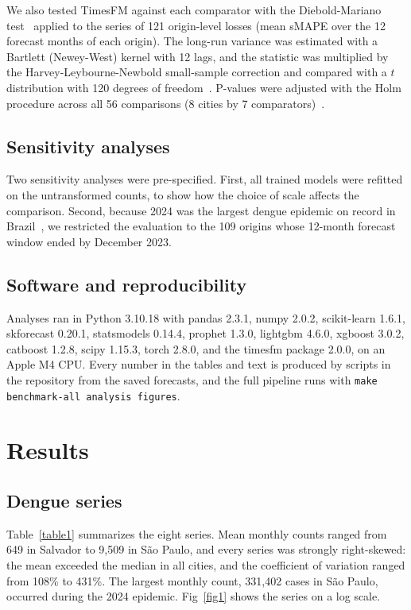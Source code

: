 \documentclass[10pt,letterpaper]{article}
\begin{document}
We also tested TimesFM against each comparator with the Diebold-Mariano test~\cite{DieboldMariano1995} applied to the series of 121 origin-level losses (mean sMAPE over the 12 forecast months of each origin). The long-run variance was estimated with a Bartlett (Newey-West) kernel with 12 lags, and the statistic was multiplied by the Harvey-Leybourne-Newbold small-sample correction and compared with a $t$ distribution with 120 degrees of freedom~\cite{HarveyLeybourneNewbold1997}. P-values were adjusted with the Holm procedure across all 56 comparisons (8 cities by 7 comparators)~\cite{Holm1979}.

\subsection*{Sensitivity analyses}
Two sensitivity analyses were pre-specified. First, all trained models were refitted on the untransformed counts, to show how the choice of scale affects the comparison. Second, because 2024 was the largest dengue epidemic on record in Brazil~\cite{GurgelGoncalves2024}, we restricted the evaluation to the 109 origins whose 12-month forecast window ended by December 2023.

\subsection*{Software and reproducibility}
Analyses ran in Python 3.10.18 with pandas 2.3.1, numpy 2.0.2, scikit-learn 1.6.1, skforecast 0.20.1, statsmodels 0.14.4, prophet 1.3.0, lightgbm 4.6.0, xgboost 3.0.2, catboost 1.2.8, scipy 1.15.3, torch 2.8.0, and the timesfm package 2.0.0, on an Apple M4 CPU. Every number in the tables and text is produced by scripts in the repository from the saved forecasts, and the full pipeline runs with \texttt{make benchmark-all analysis figures}.

\section*{Results}
\subsection*{Dengue series}
Table~\ref{table1} summarizes the eight series. Mean monthly counts ranged from 649 in Salvador to 9{,}509 in S\~ao Paulo, and every series was strongly right-skewed: the mean exceeded the median in all cities, and the coefficient of variation ranged from 108\% to 431\%. The largest monthly count, 331{,}402 cases in S\~ao Paulo, occurred during the 2024 epidemic. Fig~\ref{fig1} shows the series on a log scale.
\end{document}
